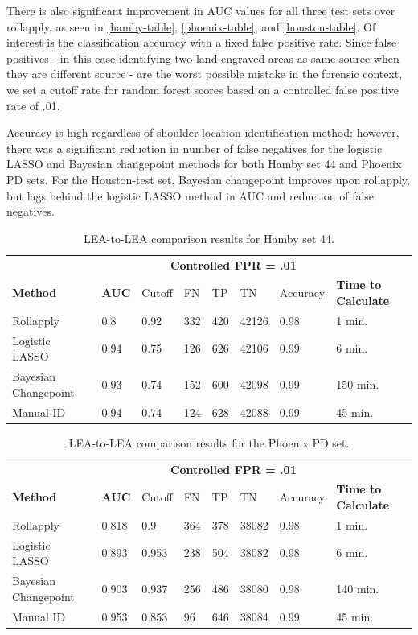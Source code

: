 \documentclass[12pt]{article}
\begin{document}
There is also significant improvement in AUC values for all three test
sets over rollapply, as seen in \autoref{hamby-table},
\autoref{phoenix-table}, and \autoref{houston-table}. Of interest is the
classification accuracy with a fixed false positive rate. Since false
positives - in this case identifying two land engraved areas as same
source when they are different source - are the worst possible mistake
in the forensic context, we set a cutoff rate for random forest scores
based on a controlled false positive rate of .01.

Accuracy is high regardless of shoulder location identification method;
however, there was a significant reduction in number of false negatives
for the logistic LASSO and Bayesian changepoint methods for both Hamby
set 44 and Phoenix PD sets. For the Houston-test set, Bayesian
changepoint improves upon rollapply, but lags behind the logistic LASSO
method in AUC and reduction of false negatives.

\begin{table}[]
\centering
\begin{tabular}{llllllll}
& & \multicolumn{5}{c}{\textbf{Controlled FPR = .01}} & \\
\textbf{Method} & \textbf{AUC} & Cutoff & FN &TP & TN & Accuracy & \textbf{Time to Calculate} \\ \hline
Rollapply & 0.8 &  0.92 & 332 & 420&42126 & 0.98 & 1 min.\\ \hline
Logistic LASSO & 0.94 &  0.75 &126 &626 &42106 & 0.99 & 6 min. \\ \hline
Bayesian Changepoint & 0.93 &  0.74 &152 & 600&42098 & 0.99 & 150 min. \\ \hline
Manual ID & 0.94 & 0.74 & 124& 628&42088 & 0.99 & 45 min. \\ \hline 
\end{tabular}
\caption{LEA-to-LEA comparison results for Hamby set 44.}
\label{hamby-table}
\end{table}

\begin{table}[]
\centering
\begin{tabular}{llllllll}
& & \multicolumn{5}{c}{\textbf{Controlled FPR = .01}} & \\
\textbf{Method} & \textbf{AUC} & Cutoff & FN &TP & TN & Accuracy & \textbf{Time to Calculate} \\ \hline
Rollapply & 0.818 &  0.9 & 364 & 378&38082 & 0.98& 1 min. \\ \hline
Logistic LASSO & 0.893 &  0.953 &238 &504 &38082 & 0.98  & 6 min. \\ \hline
Bayesian Changepoint & 0.903 &  0.937 &256 & 486&38080 & 0.98 & 140 min. \\ \hline
Manual ID & 0.953 &  0.853 & 96& 646&38084 & 0.99 & 45 min. \\ \hline 
\end{tabular}
\caption{LEA-to-LEA comparison results for the Phoenix PD set.}
\label{phoenix-table}
\end{table}
\end{document}
